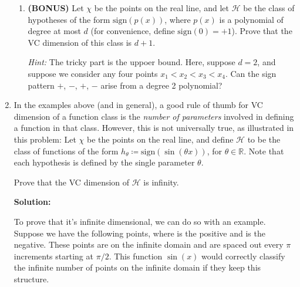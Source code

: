 \documentclass[12pt]{article}
\newcommand{\sign}[1]{\text{sign}(#1)}
\begin{document}
\begin{enumerate}
\begin{enumerate}
\item {\bf (BONUS)} Let $\chi$ be the points on the real line, and let $\mathcal{H}$ be the class of hypotheses of the form $\sign{p(x)}$, where $p(x)$ is a polynomial of degree at most $d$ (for convenience, define $\sign{0} = +1$). Prove that the VC dimension of this class is $d+1$. 

{\em Hint:} The tricky part is the uppoer bound. Here, suppose $d = 2$, and suppose we consider any four points $x_{1} < x_{2} < x_{3} < x_{4}$. Can the sign pattern $+$, $-$, $+$, $-$ arise from a degree 2 polynomial?
\end{enumerate}

\item In the examples above (and in general), a good rule of thumb for VC dimension of a function class is the {\em number of parameters} involved in defining a function in that class. However, this is not universally true, as illustrated in this problem: Let $\chi$ be the points on the real line, and define $\mathcal{H}$ to be the class of functions of the form $h_{\theta} \coloneqq \sign{\sin(\theta x)}$, for $\theta \in \mathbb{R}$. Note that each hypothesis is defined by the single parameter $\theta$.

Prove that the VC dimension of $\mathcal{H}$ is infinity.

{\bf Solution:}

To prove that it's infinite dimensional, we can do so with an example. Suppose we have the following points, where {\color{red}{red}} is the positive and {\color{blue}{blue}} is the negative. These points are on the infinite domain and are spaced out every $\pi$ increments starting at $\pi/2$. This function $\sin(x)$ would correctly classify the infinite number of points on the infinite domain if they keep this structure. 



\end{enumerate}
\end{document}
